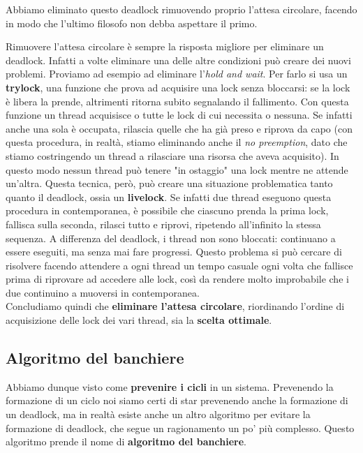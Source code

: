 \documentclass[11pt, a4paper, titlepage, oneside]{scrbook}
\begin{document}
Abbiamo eliminato questo deadlock rimuovendo proprio l'attesa circolare, facendo in modo che l'ultimo filosofo non debba aspettare il primo.

Rimuovere l'attesa circolare è sempre la risposta migliore per eliminare un deadlock. Infatti a volte eliminare una delle altre condizioni può creare dei nuovi problemi. Proviamo ad esempio ad eliminare l'\textit{hold and wait}. Per farlo si usa un \textbf{trylock}, una funzione che prova ad acquisire una lock senza bloccarsi: se la lock è libera la prende, altrimenti ritorna subito segnalando il fallimento. Con questa funzione un thread acquisisce o tutte le lock di cui necessita o nessuna. Se infatti anche una sola è occupata, rilascia quelle che ha già preso e riprova da capo (con questa procedura, in realtà, stiamo eliminando anche il \textit{no preemption}, dato che stiamo costringendo un thread a rilasciare una risorsa che aveva acquisito). In questo modo nessun thread può tenere "in ostaggio" una lock mentre ne attende un'altra. Questa tecnica, però, può creare una situazione problematica tanto quanto il deadlock, ossia un \textbf{livelock}. Se infatti due thread eseguono questa procedura in contemporanea, è possibile che ciascuno prenda la prima lock, fallisca sulla seconda, rilasci tutto e riprovi, ripetendo all'infinito la stessa sequenza. A differenza del deadlock, i thread non sono bloccati: continuano a essere eseguiti, ma senza mai fare progressi. Questo problema si può cercare di risolvere facendo attendere a ogni thread un tempo casuale ogni volta che fallisce prima di riprovare ad accedere alle lock, così da rendere molto improbabile che i due continuino a muoversi in contemporanea.  \\
Concludiamo quindi che \textbf{eliminare l'attesa circolare}, riordinando l'ordine di acquisizione delle lock dei vari thread, sia la \textbf{scelta ottimale}.

\subsection{Algoritmo del banchiere}

Abbiamo dunque visto come \textbf{prevenire i cicli} in un sistema. Prevenendo la formazione di un ciclo noi siamo certi di star prevenendo anche la formazione di un deadlock, ma in realtà esiste anche un altro algoritmo per evitare la formazione di deadlock, che segue un ragionamento un po' più complesso. Questo algoritmo prende il nome di \textbf{algoritmo del banchiere}. 
\end{document}
